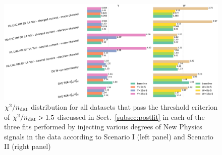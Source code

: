 \documentclass[withindex,glossary]{cam-thesis}
\begin{document}
\begin{figure}[H]
  
  \includegraphics[width=0.90\linewidth]{Figures/plot_chi2_multi.pdf}
  \caption{
  \label{fig:chi2_multi}
  $\chi^2/n_{\rm dat}$ distribution  for all datasets that pass the threshold criterion of
    $\chi^2/n_{\rm dat}>1.5$ discussed in Sect.~\ref{subsec:postfit} in each of the
    three fits performed by injecting various degrees of New Physics
    signals in the data according to Scenario I (left panel) and
    Scenario II (right panel)  }
\end{figure}
\end{document}
